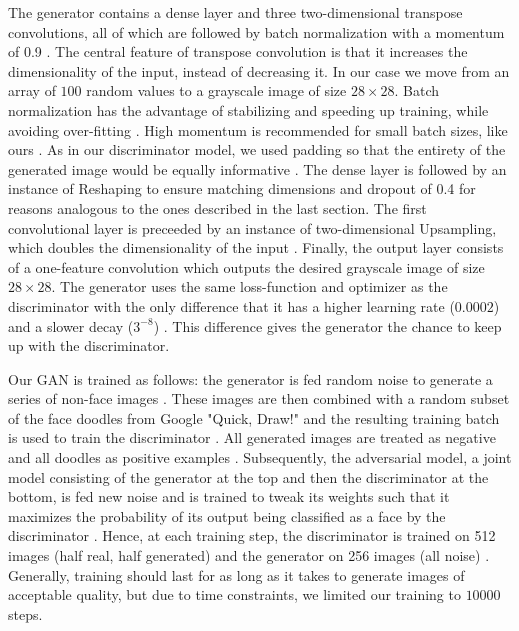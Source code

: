 \documentclass[11pt]{article}
\begin{document}
The generator contains a dense layer and three two-dimensional transpose convolutions, all of which are followed by batch normalization with a momentum of 0.9 \cite{gan}. The central feature of transpose convolution is that it increases the dimensionality of the input, instead of decreasing it. In our case we move from an array of $100$ random values to a grayscale image of size $28 \times 28$. Batch normalization has the advantage of stabilizing and speeding up training, while avoiding over-fitting \cite{batch}. High momentum is recommended for small batch sizes, like ours \cite{batch2}. As in our discriminator model, we used padding so that the entirety of the generated image would be equally informative \cite{gan}. The dense layer is followed by an instance of Reshaping to ensure matching dimensions and dropout of 0.4 for reasons analogous to the ones described in the last section. The first convolutional layer is preceeded by an instance of two-dimensional Upsampling, which doubles the dimensionality of the input \cite{gan}. Finally, the output layer consists of a one-feature convolution which outputs the desired grayscale image of size $28 \times 28$. The generator uses the same loss-function and optimizer as the discriminator with the only difference that it has a higher learning rate ($0.0002$) and a slower decay ($3^{-8}$) \cite{gan}. This difference gives the generator the chance to keep up with the discriminator.

Our GAN is trained as follows: the generator is fed random noise to generate a series of non-face images \cite{gan}. These images are then combined with a random subset of the face doodles from Google "Quick, Draw!" and the resulting training batch is used to train the discriminator \cite{gan}. All generated images are treated as negative and all doodles as positive examples \cite{gan}. Subsequently, the adversarial model, a joint model consisting of the generator at the top and then the discriminator at the bottom, is fed new noise and is trained to tweak its weights such that it maximizes the probability of its output being classified as a face by the discriminator \cite{gan}. Hence, at each training step, the discriminator is trained on 512 images (half real, half generated) and the generator on 256 images (all noise) \cite{gan}. Generally, training should last for as long as it takes to generate images of acceptable quality, but due to time constraints, we limited our training to $10000$ steps.
\end{document}
